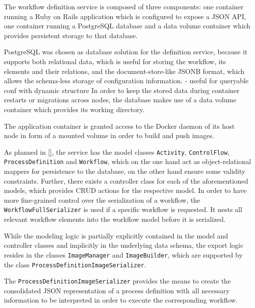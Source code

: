     The workflow definition service is composed of three components: one container running a Ruby on Rails application which is configured to expose a JSON API, one container running a PostgreSQL database and a data volume container which provides persistent storage to that database.

    PostgreSQL was chosen as database solution for the definition service, because it supports both relational data, which is useful for storing the workflow, its elements and their relations, and the document-store-like JSONB format, which allows the schema-less storage of configuration information.
    - useful for queryable conf with dynamic structure
    In order to keep the stored data during container restarts or migrations across nodes, the database makes use of a data volume container which provides its working directory.

    The application container is granted access to the Docker daemon of its host node in form of a mounted volume in order to build and push images.

    As planned in \ref{}, the service has the model classes \texttt{Activity}, \texttt{ControlFlow}, \texttt{ProcessDefinition} and \texttt{Workflow}, which on the one hand act as object-relational mappers for persistence to the database, on the other hand ensure some validity constraints. Further, there exists a controller class for each of the aforementioned models, which provides \ac{CRUD} actions for the respective model. In order to have more fine-grained control over the serialization of a workflow, the \texttt{WorkflowFullSerializer} is used if a specific workflow is requested. It nests all relevant workflow elements into the workflow model before it is serialized.

    While the modeling logic is partially explicitly contained in the model and controller classes and implicitly in the underlying data schema, the export logic resides in the classes \texttt{ImageManager} and \texttt{ImageBuilder}, which are supported by the class \texttt{ProcessDefinitionImageSerializer}.

    The \texttt{ProcessDefinitionImageSerializer} provides the means to create the consolidated JSON representation of a process definition with all necessary information to be interpreted in order to execute the corresponding workflow.


